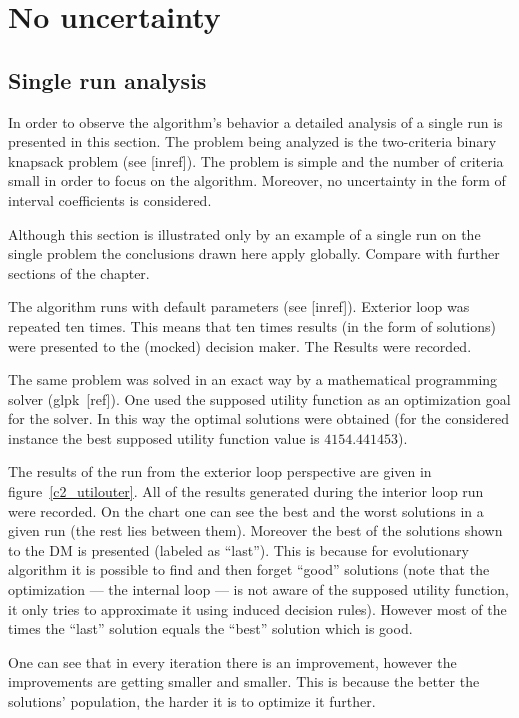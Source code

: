 \section{No uncertainty}
\subsection{Single run analysis}
In order to observe the algorithm's behavior a detailed analysis of a single
run is presented in this section. The problem being analyzed is the
two-criteria binary knapsack problem (see [inref]). The problem is simple and
the number of criteria small in order to focus on the algorithm. Moreover, no
uncertainty in the form of interval coefficients is considered.

Although this section is illustrated only by an example of a single run on the
single problem the conclusions drawn here apply globally. Compare with
further sections of the chapter.

The algorithm runs with default parameters (see [inref]). Exterior loop was
repeated ten times. This means that ten times results (in the form of
solutions) were presented to the (mocked) decision maker. The Results were
recorded.

The same problem was solved in an exact way by a mathematical programming
solver (glpk~[ref]). One used the supposed utility function as an optimization
goal for the solver. In this way the optimal solutions were obtained (for the
considered instance the best supposed utility function value is
$4154.441453$).

The results of the run from the exterior loop perspective are given in
figure~\ref{c2_utilouter}. All of the results generated during the interior
loop run were recorded. On the chart one can see the best and the worst
solutions in a given run (the rest lies between them). Moreover the best of
the solutions shown to the DM is presented (labeled as ``last''). This is
because for evolutionary algorithm it is possible to find and then forget
``good'' solutions (note that the optimization --- the internal loop --- is
not aware of the supposed utility function, it only tries to approximate it
using induced decision rules). However most of the times the ``last'' solution
equals the ``best'' solution which is good.

One can see that in every iteration there is an improvement, however the
improvements are getting smaller and smaller. This is because the better the
solutions' population, the harder it is to optimize it further.

